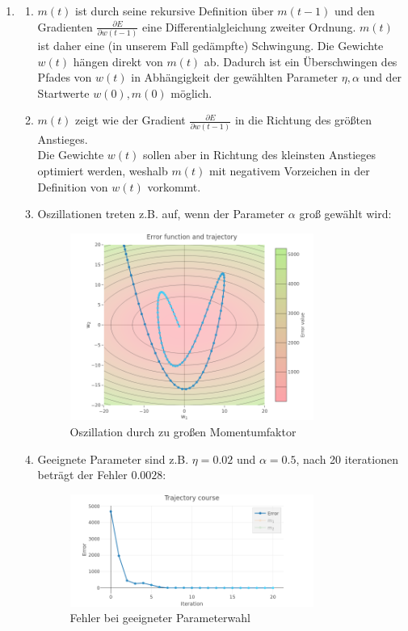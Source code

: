 \documentclass{article}
\begin{document}
\begin{enumerate}[label=\arabic*.]
  \item
        \begin{enumerate}[label=\alph*)]
          \item $m(t)$ ist durch seine rekursive Definition über $m(t-1)$ und den Gradienten $\frac{\partial E}{\partial w(t-1)}$ eine Differentialgleichung zweiter Ordnung. $m(t)$ ist daher eine (in unserem Fall gedämpfte) Schwingung. Die Gewichte $w(t)$ hängen direkt von $m(t)$ ab. Dadurch ist ein Überschwingen des Pfades von $w(t)$ in Abhängigkeit der gewählten Parameter $\eta, \alpha$ und der Startwerte $w(0), m(0)$ möglich.
          \item $m(t)$ zeigt wie der Gradient $\frac{\partial E}{\partial w(t-1)}$ in die Richtung des größten Anstieges. \\
                Die Gewichte $w(t)$ sollen aber in Richtung des kleinsten Anstieges optimiert werden, weshalb $m(t)$ mit negativem Vorzeichen in der Definition von $w(t)$ vorkommt.
          \item Oszillationen treten z.B. auf, wenn der Parameter $\alpha$ groß gewählt wird:
                \begin{figure}[H]
                  \centering
                  \includegraphics[width=0.8\textwidth]{trajectory.png}
                  \caption{Oszillation durch zu großen Momentumfaktor}
                \end{figure}

          \item Geeignete Parameter sind z.B. $\eta = 0.02$ und $\alpha = 0.5$, nach 20 iterationen beträgt der Fehler $0.0028$:
                \begin{figure}[H]
                  \centering
                  \includegraphics[width=0.8\textwidth]{13d_error.png}
                  \caption{Fehler bei geeigneter Parameterwahl}
                \end{figure}
        \end{enumerate}


\end{enumerate}
\end{document}
